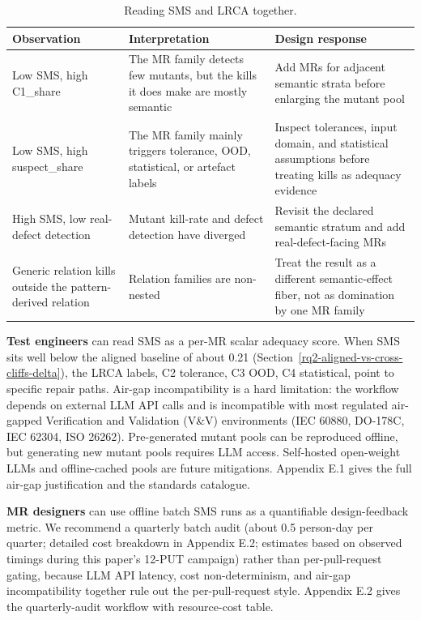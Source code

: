 \documentclass[manuscript,screen,review]{acmart}
\begin{document}
{%
\begin{longtable}[]{@{}
  >{\raggedright\arraybackslash}p{}
  >{\raggedright\arraybackslash}p{}
  >{\raggedright\arraybackslash}p{}@{}}
\caption{Reading SMS and LRCA together.}\label{tab:sms-lrca-reading}\\
\toprule\noalign{}
Observation & Interpretation & Design response \\
\midrule\noalign{}
\endfirsthead
\endhead
\bottomrule\noalign{}
\endlastfoot
Low SMS, high C1\_share & The MR family detects few mutants, but the
kills it does make are mostly semantic & Add MRs for adjacent semantic
strata before enlarging the mutant pool \\
Low SMS, high suspect\_share & The MR family mainly triggers tolerance,
OOD, statistical, or artefact labels & Inspect tolerances, input domain,
and statistical assumptions before treating kills as adequacy evidence \\
High SMS, low real-defect detection & Mutant kill-rate and defect
detection have diverged & Revisit the declared semantic stratum and add
real-defect-facing MRs \\
Generic relation kills outside the pattern-derived relation & Relation
families are non-nested & Treat the result as a different
semantic-effect fiber, not as domination by one MR family \\
\end{longtable}
}

\textbf{Test engineers} can read SMS as a per-MR scalar adequacy score.
When SMS sits well below the aligned baseline of about 0.21 (Section~\ref{rq2-aligned-vs-cross-cliffs-delta}), the
LRCA labels, C2 tolerance, C3 OOD, C4 statistical, point to specific
repair paths. Air-gap incompatibility is a hard limitation: the workflow
depends on external LLM API calls and is incompatible with most
regulated air-gapped Verification and Validation (V\&V) environments
(IEC 60880, DO-178C, IEC 62304, ISO 26262). Pre-generated mutant pools
can be reproduced offline, but generating new mutant pools requires LLM
access. Self-hosted open-weight LLMs and offline-cached pools are future
mitigations. Appendix E.1 gives the full air-gap justification and the
standards catalogue.

\textbf{MR designers} can use offline batch SMS runs as a quantifiable
design-feedback metric. We recommend a quarterly batch audit (about 0.5
person-day per quarter; detailed cost breakdown in Appendix E.2;
estimates based on observed timings during this paper's 12-PUT campaign)
rather than per-pull-request gating, because LLM API latency, cost
non-determinism, and air-gap incompatibility together rule out the
per-pull-request style. Appendix E.2 gives the quarterly-audit workflow
with resource-cost table.
\end{document}
